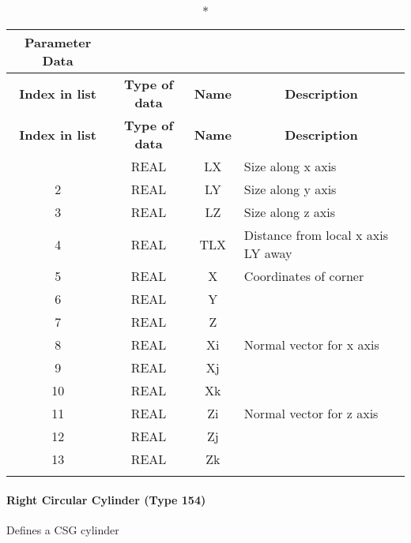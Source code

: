 \begin{longtable}[H]{|c|c|c|l|}
  \caption*{Parameter Data} \\

  \hline
  \multicolumn{1}{|c|}{\textbf{Index in list}} & \multicolumn{1}{|c|}{\textbf{Type of data}} &
  \multicolumn{1}{|c|}{\textbf{Name}} & \multicolumn{1}{|c|}{\textbf{Description}} \\ \hline
  \endfirsthead
  \hline
  
  \multicolumn{1}{|c|}{\textbf{Index in list}} & \multicolumn{1}{|c|}{\textbf{Type of data}} &
  \multicolumn{1}{|c|}{\textbf{Name}} & \multicolumn{1}{|c|}{\textbf{Description}} \\ \hline
  \endhead
  
  \endfoot

  \endlastfoot
1 & REAL & LX & Size along x axis\\ \hline
2 & REAL & LY & Size along y axis\\ \hline
3 & REAL & LZ & Size along z axis\\ \hline
4 & REAL & TLX & Distance from local x axis LY away\\ \hline
5 & REAL & X & Coordinates of corner\\ \hline
6 & REAL & Y &\\ \hline
7 & REAL & Z &\\ \hline
8 & REAL & Xi & Normal vector for x axis\\ \hline
9 & REAL & Xj &\\ \hline
10 & REAL & Xk &\\ \hline
11 & REAL & Zi & Normal vector for z axis\\ \hline
12 & REAL & Zj &\\ \hline
13 & REAL & Zk &\\ \hline
\\ \hline
\end{longtable}

\paragraph{Right Circular Cylinder (Type
154)}\label{right-circular-cylinder-type-154}

Defines a CSG cylinder

